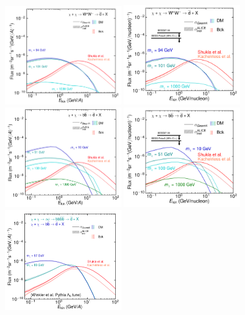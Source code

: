 \begin{figure}[hbtp]
    \centering
    \includegraphics[width=0.45\textwidth]{figures/antideuteron_fluxes_WW_LIS.png}
    \includegraphics[width=0.45\textwidth]{figures/WWdbarPaperTOA.pdf}
    \includegraphics[width=0.45\textwidth]{figures/antideuteron_fluxes_bb_LIS.png}
    \includegraphics[width=0.45\textwidth]{figures/bbdbarPaperTOA.pdf}
    \includegraphics[width=0.45\textwidth]{figures/antideuteron_fluxes_Lambda_b_light_mediators_LIS.png}

\end{figure}
